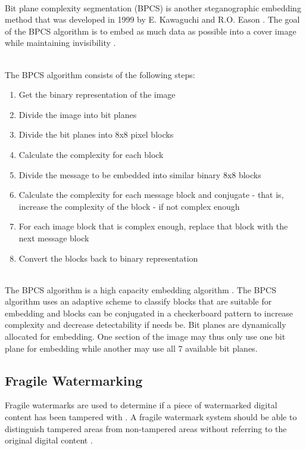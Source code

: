 \documentclass[12pt]{article}
\begin{document}
\hspace{0pt} \\
Bit plane complexity segmentation (BPCS) is another steganographic embedding method that was developed in 1999 by E. Kawaguchi and R.O. Eason \cite{kawaguchi1999principles}. 
The goal of the BPCS algorithm is to embed as much data as possible into a cover image while maintaining invisibility \cite{beaullieubpcs}.

\hspace{0pt} \\
The BPCS algorithm consists of the following steps:
\begin{enumerate}
  \item Get the binary representation of the image
  \item Divide the image into bit planes
  \item Divide the bit planes into 8x8 pixel blocks
  \item Calculate the complexity for each block
  \item Divide the message to be embedded into similar binary 8x8 blocks
  \item Calculate the complexity for each message block and conjugate - that is, increase the complexity of the block - if not complex enough
  \item For each image block that is complex enough, replace that block with the next message block
  \item Convert the blocks back to binary representation 
\end{enumerate}

\hspace{0pt} \\
The BPCS algorithm is a high capacity embedding algorithm \cite{beaullieubpcs}.
The BPCS algorithm uses an adaptive scheme to classify blocks that are suitable for embedding and blocks can be conjugated in a checkerboard pattern to increase complexity and decrease detectability if needs be.
Bit planes are dynamically allocated for embedding.
One section of the image may thus only use one bit plane for embedding while another may use all 7 available bit planes.

\subsection{Fragile Watermarking}
\label{introFragWatermarking}
Fragile watermarks are used to determine if a piece of watermarked digital content has been tampered with \cite{liu2007image}. A fragile watermark system should be able to distinguish tampered areas from non-tampered areas without referring to the original digital content \cite{liu2007image}.
\end{document}
